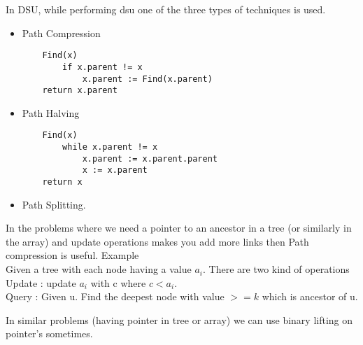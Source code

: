 \documentclass[../Notes.tex]{subfiles}
\begin{document}
In DSU, while performing dsu one of the three types of techniques is used.
\begin{itemize}
	\item Path Compression \\
	\begin{lstlisting}
	Find(x)
    	if x.parent != x
     		x.parent := Find(x.parent)
	return x.parent
   	\end{lstlisting}
   	
   	\item Path Halving \\
   	\begin{lstlisting}
   	Find(x)
   		while x.parent != x
     		x.parent := x.parent.parent
     		x := x.parent
   	return x
   \end{lstlisting}
   
   \item Path Splitting.
\end{itemize}
In the problems where we need a pointer to an ancestor in a tree (or similarly in the array) and update operations makes you add more links then Path compression is useful. Example \\

Given a tree with each node having a value $a_{i}$. There are two kind of operations\\
Update : update $a_{i}$ with c where $c<a_{i}$.\\
Query : Given u. Find the deepest node with value $>= k$ which is ancestor of u.

In similar problems (having pointer in tree or array) we can use binary lifting on pointer's sometimes.
\end{document}
